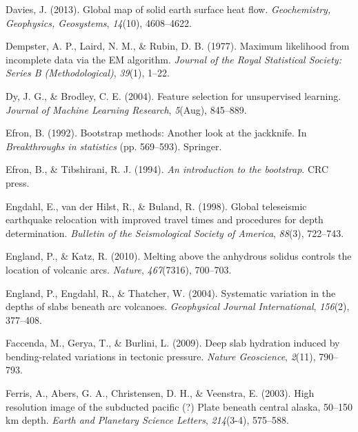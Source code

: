 \begin{CSLReferences}{1}{1}
\leavevmode{}%
Davies, J. (2013). Global map of solid earth surface heat flow. \emph{Geochemistry, Geophysics, Geosystems}, \emph{14}(10), 4608--4622.

\leavevmode{}%
Dempster, A. P., Laird, N. M., \& Rubin, D. B. (1977). Maximum likelihood from incomplete data via the EM algorithm. \emph{Journal of the Royal Statistical Society: Series B (Methodological)}, \emph{39}(1), 1--22.

\leavevmode{}%
Dy, J. G., \& Brodley, C. E. (2004). Feature selection for unsupervised learning. \emph{Journal of Machine Learning Research}, \emph{5}(Aug), 845--889.

\leavevmode{}%
Efron, B. (1992). Bootstrap methods: Another look at the jackknife. In \emph{Breakthroughs in statistics} (pp. 569--593). Springer.

\leavevmode{}%
Efron, B., \& Tibshirani, R. J. (1994). \emph{An introduction to the bootstrap}. CRC press.

\leavevmode{}%
Engdahl, E., van der Hilst, R., \& Buland, R. (1998). Global teleseismic earthquake relocation with improved travel times and procedures for depth determination. \emph{Bulletin of the Seismological Society of America}, \emph{88}(3), 722--743.

\leavevmode{}%
England, P., \& Katz, R. (2010). Melting above the anhydrous solidus controls the location of volcanic arcs. \emph{Nature}, \emph{467}(7316), 700--703.

\leavevmode{}%
England, P., Engdahl, R., \& Thatcher, W. (2004). Systematic variation in the depths of slabs beneath arc volcanoes. \emph{Geophysical Journal International}, \emph{156}(2), 377--408.

\leavevmode{}%
Faccenda, M., Gerya, T., \& Burlini, L. (2009). Deep slab hydration induced by bending-related variations in tectonic pressure. \emph{Nature Geoscience}, \emph{2}(11), 790--793.

\leavevmode{}%
Ferris, A., Abers, G. A., Christensen, D. H., \& Veenstra, E. (2003). High resolution image of the subducted pacific (?) Plate beneath central alaska, 50--150 km depth. \emph{Earth and Planetary Science Letters}, \emph{214}(3-4), 575--588.


\end{CSLReferences}
